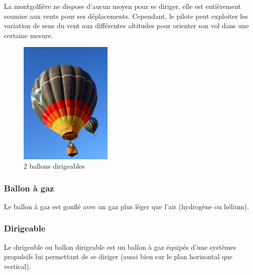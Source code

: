 	La montgolfière ne dispose d'aucun moyen pour se diriger, elle est entièrement soumise aux vents pour ses déplacements. Cependant, le pilote peut exploiter les variation de sens du vent aux différentes altitudes pour orienter son vol dans une certaine mesure.
	
	\begin{figure}[H]
  	\centering
    \includegraphics[width=0.4\textwidth]{1-EtudeAeronefs/img/montgolfiere.jpg}
  	\caption{2 ballons dirigeables \cite{img:montgolfiere}}
	\end{figure}	
	
	\subsubsection{Ballon à gaz}
	Le ballon à gaz est gonflé avec un gaz plus léger que l'air (hydrogène ou hélium).	
	
	\subsubsection{Dirigeable}
	Le dirigeable ou ballon dirigeable est un ballon à gaz équipés d'une systèmes propulsifs lui permettant de se diriger (aussi bien sur le plan horizontal que vertical). \\
	
